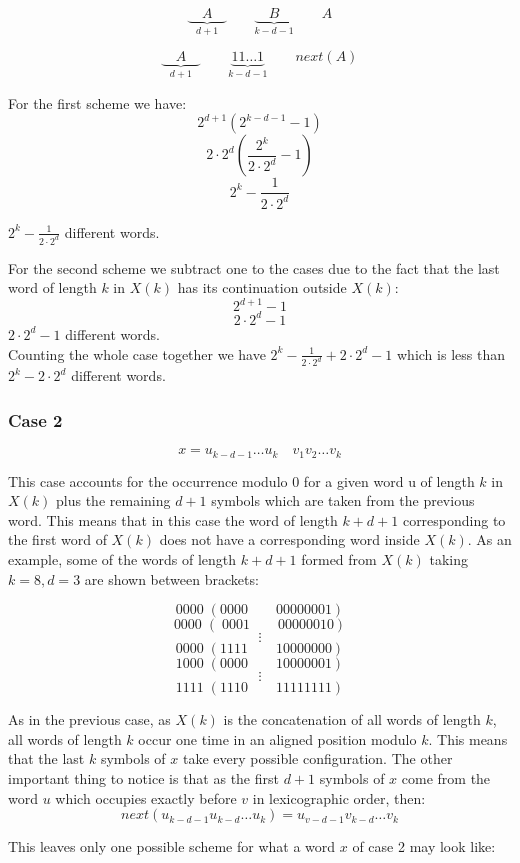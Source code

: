 \documentclass[11pt,a4paper]{tesis}
\theoremstyle{definition}
\begin{document}
$$\underbrace{\quad A \quad }_{d +1} \qquad \underbrace{\quad B \quad }_{k - d - 1}  \qquad A$$


$$\underbrace{\quad A \quad }_{d +1} \qquad \underbrace{ 11 \dots 1  }_{k - d - 1}  \qquad next(A) $$

For the first scheme we have:
$$2^{d + 1}  (2^{k - d - 1} - 1)$$
$$ 2\cdot2^{d}  (\frac{2^k}{2\cdot2^d} - 1)$$
$$ 2^k - \frac{1}{2\cdot2^{d} }$$

$ 2^k - \frac{1}{2\cdot2^{d} }$ different words.

For the second scheme we subtract one to the cases due to the fact that the last word of length $k$ in $X(k)$ has its continuation outside $X(k)$:
$$2^{d + 1}   - 1$$
$$2\cdot 2^d - 1$$
$ 2\cdot 2^d - 1 $ different words.
\\

Counting the whole case together we have $  2^k - \frac{1}{2\cdot2^{d} } + 2\cdot 2^d - 1$ which is less than $2^k -  2\cdot 2^d$ different words.

\subsubsection{Case 2}
$$ x = u_{k-d-1} \dots u_k \quad v_1 v_2 \dots v_k$$

This case accounts for the occurrence modulo 0 for a given word u of length $k$ in $X(k)$ plus the remaining $d + 1$ symbols which are taken from the previous word. This means that in this case the word of length $k + d + 1$ corresponding to the first word of $X(k)$ does not have a corresponding word inside $X(k)$.
As an example, some of the words of length $k + d + 1$ formed from $X(k)$ taking $k = 8, d = 3$ are shown between brackets:

$$0000 \; (0000 \qquad 00000001)$$
$$0000 \; ( \; 0001 \qquad 00000010)$$
$$\vdots$$
$$0000 \; (1111 \qquad 10000000)$$
$$1000 \; (0000 \qquad 10000001)$$
$$\vdots$$
$$1111 \; (1110 \qquad 11111111)$$

As in the previous case, as $X(k)$ is the concatenation of all words of length $k$, all words of length $k$ occur one time in an aligned position modulo $k$. This means that the last $k$ symbols of $x$ take every possible configuration.
The other important thing to notice is that as the first $d + 1$ symbols of $x$ come from the word $u$ which occupies exactly before $v$ in lexicographic order, then: 
$$next(u_{k-d-1} u_{k-d} \dots u_k) = u_{v-d-1} v_{k-d} \dots v_k$$

This leaves only one possible scheme for what a word $x$ of case 2 may look like:
\end{document}
